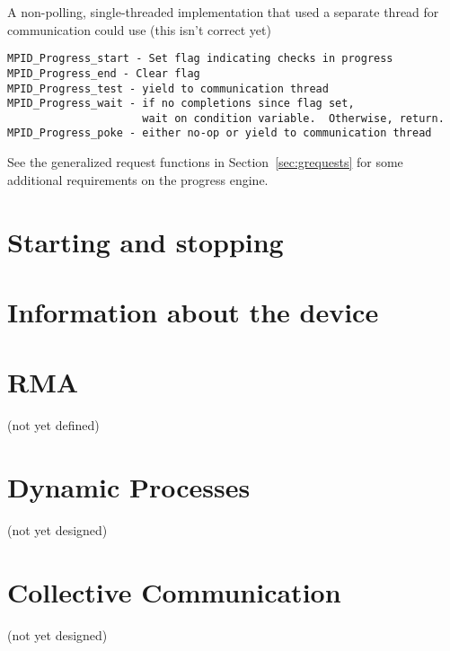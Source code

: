 \documentclass{article}
\begin{document}
A non-polling, single-threaded implementation that used a separate
thread for communication could use (this isn't correct yet)
\begin{verbatim}
MPID_Progress_start - Set flag indicating checks in progress
MPID_Progress_end - Clear flag
MPID_Progress_test - yield to communication thread
MPID_Progress_wait - if no completions since flag set, 
                     wait on condition variable.  Otherwise, return.
MPID_Progress_poke - either no-op or yield to communication thread
\end{verbatim}

See the generalized request functions in Section~\ref{sec:grequests}
for some additional requirements on the progress engine.







\section{Starting and stopping}




\section{Information about the device}


\section{RMA}
(not yet defined)
%
%
%
%
%
%
%
%
%

\section{Dynamic Processes}
(not yet designed)

\section{Collective Communication}
(not yet designed)
\end{document}
